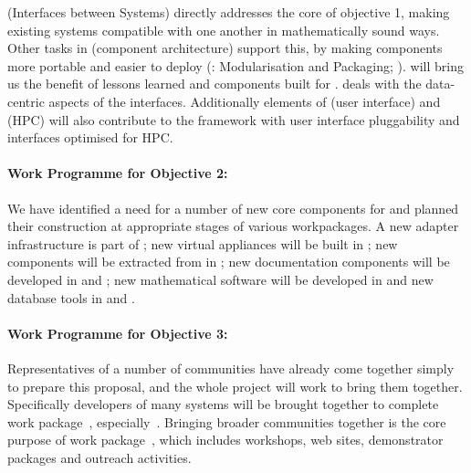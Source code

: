 \documentclass[noworkareas,deliverables,\classoptions]{euproposal}       %
\begin{document}
\begin{proposal}
 (Interfaces
between Systems) directly addresses the core of objective 1, making
existing systems compatible with one another in mathematically sound
ways. Other tasks in  (component
architecture) support this, by making components more portable and
easier to deploy (:
Modularisation and Packaging;
). 
will bring us the benefit of lessons learned and components built for
\SMC.  deals with the data-centric
aspects of the interfaces. Additionally elements of  (user interface) and  (HPC)
will also contribute to the framework with user interface pluggability
and interfaces optimised for HPC.

\paragraph{Work Programme for Objective 2: }

We have identified a need for a number of new core components for
\TheProject and planned their construction at appropriate stages of
various workpackages. A new adapter infrastructure is part of
; new virtual
appliances will be built in
; new components will be
extracted from \SMC in  ;
new documentation components will be developed in
 and ; new
mathematical software will be developed in 
and new database tools in  and .


\paragraph{Work Programme for Objective 3: }

Representatives of a number of communities have already come together
simply to prepare this proposal, and the whole project will work to
bring them together. Specifically developers of many systems  will be brought together to complete
work package~, 
especially~.
Bringing broader communities together is the core purpose of 
work package~, which includes workshops, web sites,
demonstrator packages and outreach activities. 


\end{proposal}
\end{document}
